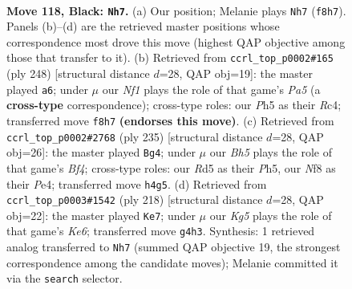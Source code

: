 \documentclass[11pt]{article}
\begin{document}
\clearpage

\begin{figure}[p]\centering
\begin{subfigure}{0.46\textwidth}\centering
\resizebox{\linewidth}{!}{%
\newchessgame
\chessboard[
  setfen={1R3n2/8/8/3rp2p/6kb/8/3p4/3K4 b - - 1 118},
  showmover=false,
  pgfstyle=straightmove, color=movearrow, markmove={f8-h7}
]}
\caption{}
\end{subfigure}\hfill
\begin{subfigure}{0.46\textwidth}\centering
\resizebox{\linewidth}{!}{%
\newchessgame
\chessboard[
  setfen={8/8/2k5/P1P3r1/1KR5/8/8/8 w - - 9 125},
  showmover=false,
  pgfstyle=straightmove, color=movearrow, markmove={a5-a6}
]}
\caption{}
\end{subfigure}
\\[4pt]
\begin{subfigure}{0.46\textwidth}\centering
\resizebox{\linewidth}{!}{%
\newchessgame
\chessboard[
  setfen={8/4R3/8/5b1p/4pk1P/3p4/3K4/8 b - - 7 118},
  showmover=false,
  pgfstyle=straightmove, color=movearrow, markmove={f5-g4}
]}
\caption{}
\end{subfigure}\hfill
\begin{subfigure}{0.46\textwidth}\centering
\resizebox{\linewidth}{!}{%
\newchessgame
\chessboard[
  setfen={8/7k/4K2P/5P2/8/7R/1r6/8 w - - 71 110},
  showmover=false,
  pgfstyle=straightmove, color=movearrow, markmove={e6-e7}
]}
\caption{}
\end{subfigure}
\caption{\textbf{Move 118, Black: \texttt{Nh7}.} (a) Our position; Melanie plays \texttt{Nh7} (\texttt{f8h7}). Panels (b)--(d) are the retrieved master positions whose correspondence most drove this move (highest QAP objective among those that transfer to it). (b) Retrieved from \texttt{ccrl\_top\_p0002\#165} (ply 248) [structural distance $d$=28, QAP obj=19]: the master played \texttt{a6}; under $\mu$ our \emph{Nf1} plays the role of that game's \emph{Pa5} (a \textbf{cross-type} correspondence); cross-type roles: our \emph{P}h5 as their \emph{R}c4; transferred move \texttt{f8h7} \textbf{(endorses this move)}. (c) Retrieved from \texttt{ccrl\_top\_p0002\#2768} (ply 235) [structural distance $d$=28, QAP obj=26]: the master played \texttt{Bg4}; under $\mu$ our \emph{Bh5} plays the role of that game's \emph{Bf4}; cross-type roles: our \emph{R}d5 as their \emph{P}h5, our \emph{N}f8 as their \emph{P}e4; transferred move \texttt{h4g5}. (d) Retrieved from \texttt{ccrl\_top\_p0003\#1542} (ply 218) [structural distance $d$=28, QAP obj=22]: the master played \texttt{Ke7}; under $\mu$ our \emph{Kg5} plays the role of that game's \emph{Ke6}; transferred move \texttt{g4h3}. Synthesis: 1 retrieved analog transferred to \texttt{Nh7} (summed QAP objective 19, the strongest correspondence among the candidate moves); Melanie committed it via the \texttt{search} selector.}
\label{fig:thought-m235}
\end{figure}
\end{document}
